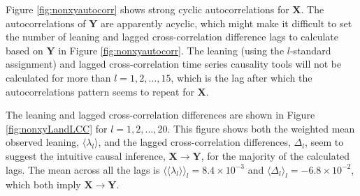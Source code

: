 Figure \ref{fig:nonxyautocorr} shows strong cyclic autocorrelations for $\mathbf{X}$.  The autocorrelations of $\mathbf{Y}$ are apparently acyclic, which might make it difficult to set the number of leaning and lagged cross-correlation difference lags to calculate based on $\mathbf{Y}$ in Figure \ref{fig:nonxyautocorr}.  The leaning (using the $l$-standard assignment) and lagged cross-correlation time series causality tools will not be calculated for more than $l=1,2,\ldots,15$, which is the lag after which the autocorrelations pattern seems to repeat for $\mathbf{X}$.  

The leaning and lagged cross-correlation differences are shown in Figure \ref{fig:nonxyLandLCC} for $l=1,2,\ldots,20$.  This figure shows both the weighted mean observed leaning, $\langle \lambda_l\rangle$, and the lagged cross-correlation differences, $\Delta_l$, seem to suggest the intuitive causal inference, $\mathbf{X}\rightarrow\mathbf{Y}$, for the majority of the calculated lags.  The mean across all the lags is $\langle\langle\lambda_l\rangle\rangle_l=8.4\times 10^{-3}$ and $\langle\Delta_l\rangle_l=-6.8\times 10^{-2}$, which both imply $\mathbf{X}\rightarrow\mathbf{Y}$. 
